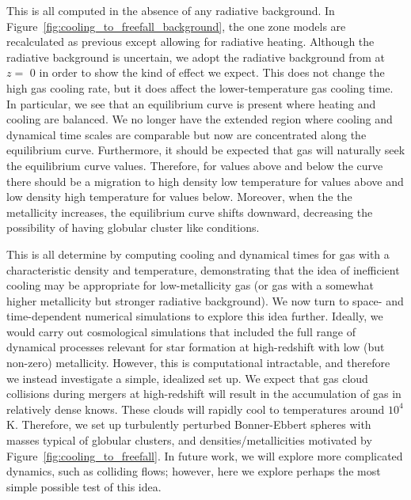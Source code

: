 \documentclass[useAMS,usenatbib]{mn2e}
\begin{document}
This is all computed in the absence of any radiative background.  In Figure~\ref{fig:cooling_to_freefall_background}, 
the one zone models are recalculated as previous except allowing for radiative heating.   Although the radiative background
is uncertain, we adopt the radiative background from \citet{Haardt2012} at $z=$ 0 
in order to show the kind of effect we expect.  This does not change the high gas cooling rate, but it does affect the lower-temperature gas cooling time.   In particular, we see that an equilibrium curve is present where
heating and cooling are balanced. We no longer have the extended region where cooling and dynamical time scales are 
comparable but now are concentrated along the equilibrium curve. Furthermore, it should be expected that gas will
naturally seek the equilibrium curve values. Therefore, for values above and below the curve there should be a migration
to high density low temperature for values above and low density high temperature for values below.  Moreover, when the
the metallicity increases, the equilibrium curve shifts downward, decreasing the possibility of having globular cluster
like conditions.


This is all determine by computing cooling and dynamical times for gas with a characteristic density and temperature, demonstrating that the idea of inefficient cooling may be appropriate for low-metallicity gas (or gas with a somewhat higher metallicity but stronger radiative background).   We now turn to space- and time-dependent numerical simulations to explore this idea further.  Ideally, we would carry out cosmological simulations that included the full range of dynamical processes relevant for star formation at high-redshift with low (but non-zero) metallicity.  However, this is computational intractable, and therefore we instead investigate a simple, idealized set up.  We expect that gas cloud collisions during mergers at high-redshift will result in the accumulation of gas in relatively dense knows.  These clouds will rapidly cool to temperatures around $10^4$ K.  Therefore, we set up turbulently perturbed Bonner-Ebbert spheres with masses typical of globular clusters, and densities/metallicities motivated by Figure~\ref{fig:cooling_to_freefall}.   In future work, we will explore more complicated dynamics, such as colliding flows; however, here we explore perhaps the most simple possible test of this idea.
\end{document}
